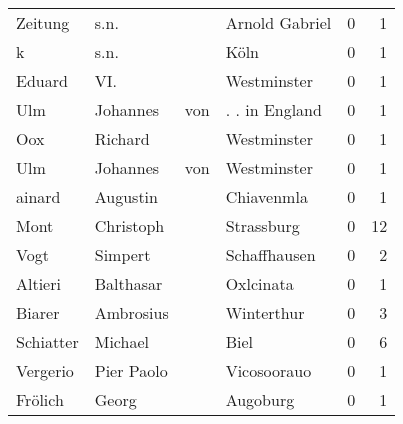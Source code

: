 \begin{tabular}{llllrr}
                  Zeitung &                               s.n. &             &                              Arnold Gabriel &          0 &         1 \\
                        k &                               s.n. &             &                                        Köln &          0 &         1 \\
                   Eduard &                                VI. &             &                                 Westminster &          0 &         1 \\
                      Ulm &                           Johannes &         von &                              . . in England &          0 &         1 \\
                      Oox &                            Richard &             &                                 Westminster &          0 &         1 \\
                      Ulm &                           Johannes &         von &                                 Westminster &          0 &         1 \\
                   ainard &                           Augustin &             &                                  Chiavenmla &          0 &         1 \\
                     Mont &                          Christoph &             &                                  Strassburg &          0 &        12 \\
                     Vogt &                            Simpert &             &                                Schaffhausen &          0 &         2 \\
                  Altieri &                          Balthasar &             &                                   Oxlcinata &          0 &         1 \\
                   Biarer &                          Ambrosius &             &                                  Winterthur &          0 &         3 \\
                Schiatter &                            Michael &             &                                        Biel &          0 &         6 \\
                 Vergerio &                         Pier Paolo &             &                                 Vicosoorauo &          0 &         1 \\
                  Frölich &                              Georg &             &                                    Augoburg &          0 &         1 \\

\end{tabular}

